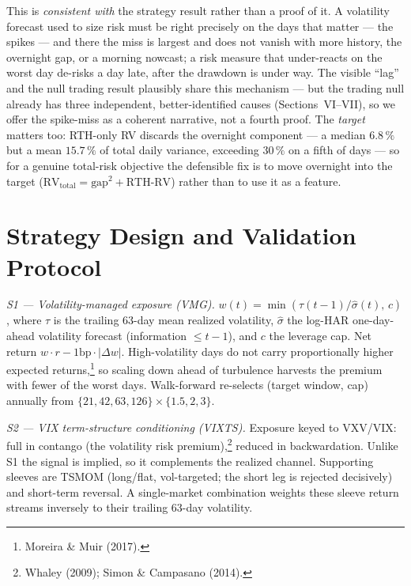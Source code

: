 \documentclass[12pt,a4paper]{article}
\newcommand{\cf}[1]{\footnote{#1}}
\begin{document}
This is \emph{consistent with} the strategy result rather than a proof of it. A volatility forecast
used to size risk must be right precisely on the days that matter --- the spikes --- and there the
miss is largest and does not vanish with more history, the overnight gap, or a morning nowcast; a
risk measure that under-reacts on the worst day de-risks a day late, after the drawdown is under way.
The visible ``lag'' and the null trading result plausibly share this mechanism --- but the trading
null already has three independent, better-identified causes (Sections~VI--VII), so we offer the
spike-miss as a coherent narrative, not a fourth proof. The \emph{target} matters too: RTH-only RV
discards the overnight component --- a median $6.8\,\%$ but a mean $15.7\,\%$ of total daily variance,
exceeding $30\,\%$ on a fifth of days --- so for a genuine total-risk objective the defensible fix is
to move overnight into the target ($\mathrm{RV}_{\text{total}}=\text{gap}^2+\text{RTH-RV}$) rather
than to use it as a feature.

\section{Strategy Design and Validation Protocol}

\emph{S1 --- Volatility-managed exposure (VMG).} $w(t)=\min(\tau(t{-}1)/\hat\sigma(t),\,c)$, where
$\tau$ is the trailing 63-day mean realized volatility, $\hat\sigma$ the log-HAR one-day-ahead
volatility forecast (information $\le t{-}1$), and $c$ the leverage cap. Net return
$w\cdot r-1\text{bp}\cdot|\Delta w|$. High-volatility days do not carry proportionally higher expected
returns,\cf{Moreira \& Muir (2017).} so scaling down ahead of turbulence harvests the premium with
fewer of the worst days. Walk-forward re-selects (target window, cap) annually from
$\{21,42,63,126\}\times\{1.5,2,3\}$.

\emph{S2 --- VIX term-structure conditioning (VIXTS).} Exposure keyed to VXV/VIX: full in contango
(the volatility risk premium),\cf{Whaley (2009); Simon \& Campasano (2014).} reduced in backwardation.
Unlike S1 the signal is implied, so it complements the realized channel. Supporting sleeves are TSMOM
(long/flat, vol-targeted; the short leg is rejected decisively) and short-term reversal. A
single-market combination weights these sleeve return streams inversely to their trailing 63-day
volatility.
\end{document}
